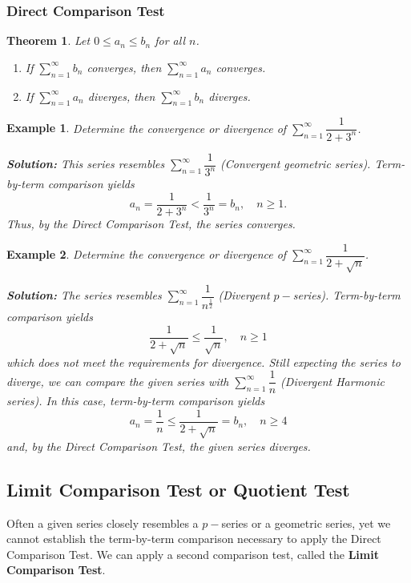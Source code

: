 \documentclass[titlepage,a4paper,12pt]{report}
\newtheorem{example}{Example}[section]
\newtheorem{theorem}{Theorem}[section]
\begin{document}
\subsubsection{Direct Comparison Test}
\begin{theorem}
Let $0\leq a_n\leq b_n$ for all $n$.
\begin{enumerate}
\item If $\displaystyle \sum _{n=1}^\infty b_n$ converges, then $\displaystyle \sum _{n=1}^\infty a_n$ converges.
\item If $\displaystyle \sum _{n=1}^\infty a_n$ diverges, then $\displaystyle \sum _{n=1}^\infty b_n$ diverges.
\end{enumerate}
\end{theorem}
\begin{example}
Determine the convergence or divergence of $\displaystyle \sum _{n=1}^\infty \dfrac{1}{2+3^n}$.

\noindent \textbf{Solution:} This series resembles $\displaystyle \sum _{n=1}^\infty \dfrac{1}{3^n}$ (Convergent geometric series). Term-by-term comparison yields 
\[a_n=\dfrac{1}{2+3^n}<\dfrac{1}{3^n}=b_n, \quad n\geq 1.\]
Thus, by the Direct Comparison Test, the series converges.
\end{example}
\begin{example}
Determine the convergence or divergence of $\displaystyle \sum _{n=1}^\infty \dfrac{1}{2+\sqrt{n}}$.

\noindent \textbf{Solution:} The series resembles $\displaystyle \sum _{n=1}^\infty \dfrac{1}{n^{\frac{1}{2}}}$ (Divergent $p-$series). Term-by-term comparison yields 
\[\dfrac{1}{2+\sqrt{n}}\leq \dfrac{1}{\sqrt{n}}, \quad n\geq 1\]
which does not meet the requirements for divergence. Still expecting the series to diverge, we can compare the given series with $\displaystyle \sum _{n=1}^\infty \dfrac{1}{n}$ (Divergent Harmonic series). In this case, term-by-term comparison yields 
\[a_n=\dfrac{1}{n}\leq \dfrac{1}{2+\sqrt{n}}=b_n, \quad n\geq 4\] and, by the Direct Comparison Test, the given series diverges.
\end{example}
\subsection{Limit Comparison Test or Quotient Test}
Often a given series closely resembles a $p-$series or a geometric series, yet we cannot establish the term-by-term comparison necessary to apply the Direct Comparison Test. We can apply a second comparison test, called the \textbf{Limit Comparison Test}.
\end{document}
